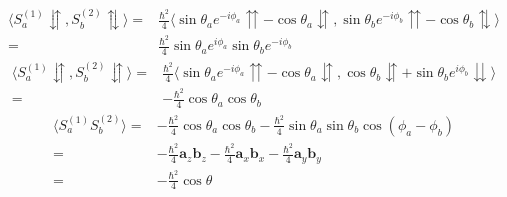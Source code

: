         \begin{align*}
            \langle S_a^{(1)}\downuparrows, S_b^{(2)}\updownarrows\rangle = & 
            \frac{\hbar^2}{4}
            \langle
            \sin\theta_ae^{-i\phi_a} \upuparrows -
            \cos\theta_a\downuparrows
            ,
            \sin\theta_b e^{-i\phi_b}\upuparrows -
            \cos\theta_b\updownarrows
            \rangle\\
            =&\frac{\hbar^2}{4}\sin\theta_ae^{i\phi_a}\sin\theta_be^{-i\phi_b}
        \end{align*}
        \begin{align*}
            \langle S_a^{(1)}\downuparrows, S_b^{(2)}\downuparrows\rangle = & 
            \frac{\hbar^2}{4}
            \langle
            \sin\theta_ae^{-i\phi_a} \upuparrows -
            \cos\theta_a\downuparrows
            ,
            \cos\theta_b \downuparrows +
            \sin\theta_be^{i\phi_b}\downdownarrows
            \rangle\\
            =&-\frac{\hbar^2}{4}\cos\theta_a\cos\theta_b
        \end{align*}
        \begin{align*}
            \langle S_a^{(1)}S_b^{(2)}\rangle=&
            -\frac{\hbar^2}{4}\cos\theta_a\cos\theta_b
            -\frac{\hbar^2}{4}\sin\theta_a\sin\theta_b\cos(\phi_a-\phi_b)\\
            =&-\frac{\hbar^2}{4}\bm a_z\bm b_z
            -\frac{\hbar^2}{4}\bm a_x\bm b_x - 
            \frac{\hbar^2}{4}\bm a_y\bm b_y \\
            =&-\frac{\hbar^2}{4}\cos\theta
        \end{align*}
